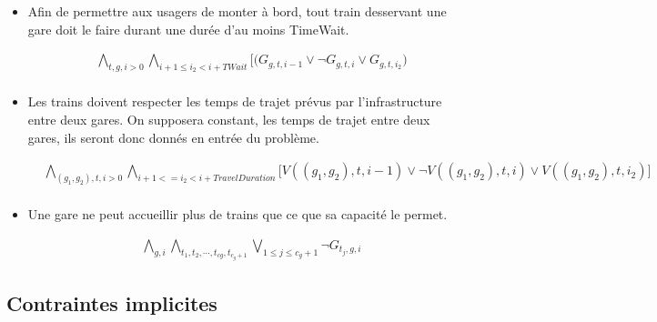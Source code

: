 \documentclass[a4paper]{article}
\begin{document}
\begin{itemize}
\item{Afin de permettre aux usagers de monter à bord, tout train desservant une gare doit
le faire durant une durée d’au moins TimeWait.}

    \begin{equation*}
    \begin{split}
      & 
      \bigwedge_{t, g, i > 0} 
      \bigwedge_{i+1 \leq i_2<i+TWait} \big[
      \big(G_{g, t, i-1} \lor \neg G_{g, t, i} \lor G_{g, t, i_2} \big) \\
    \end{split}
    \end{equation*}

\item{Les trains doivent respecter les temps de trajet prévus par l’infrastructure entre deux
gares. On supposera constant, les temps de trajet entre deux gares, ils seront donc donnés en entrée du problème.}

    \begin{equation*}
    \begin{split}
      & 
      \bigwedge_{(g_1, g_2), t, i > 0} 
      \bigwedge_{i+1<=i_2<i+TravelDuration} 
      \big[ V((g_1, g_2), t, i-1) \lor \neg V((g_1, g_2), t, i) \lor V((g_1, g_2), t, i_2)\big] \\
    \end{split}
    \end{equation*}

\item{Une gare ne peut accueillir plus de trains que ce que sa capacité le permet.}

    \begin{equation*}
    \begin{split}
        & \bigwedge_{g, i} 
        \bigwedge_{t_1, t_2, \cdots, t_{cg}, t_{c_g+1}} 
        \bigvee_{1 \leq j \leq c_g+1} \neg G_{t_j, g, i}
    \end{split}
    \end{equation*}
    

\end{itemize}

\subsection{Contraintes implicites}
\end{document}
